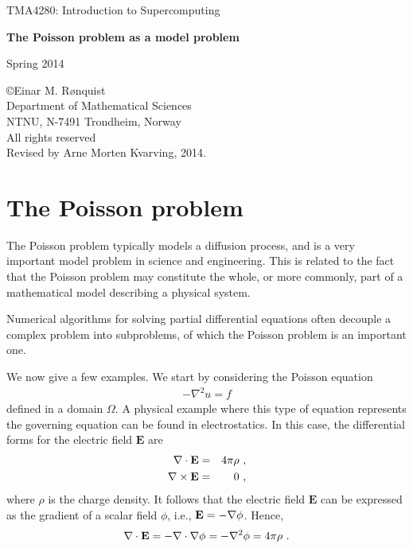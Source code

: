 \documentclass[11pt]{article}
\begin{document}
 
\LARGE
\begin{center}
TMA4280: Introduction to Supercomputing
\end{center}
\vspace{1in}

\begin{center}
{\bf The Poisson problem as a model problem}
\end{center}

\Large
\vspace{0.5in}
\begin{center}
Spring 2014
\end{center}

\vspace{0.5in}

\begin{center}
\copyright Einar M. R{\o}nquist \\
Department of Mathematical Sciences\\
NTNU, N-7491 Trondheim, Norway\\
All rights reserved \\
Revised by Arne Morten Kvarving, 2014.
\end{center}

\large

\newpage

\section{The Poisson problem}
The Poisson problem typically models a diffusion process, and 
is a very important model problem in science and engineering. 
This is related to the fact that the Poisson problem may 
constitute the whole, or more commonly, part of a mathematical 
model describing a physical system.

Numerical algorithms for solving partial differential 
equations often decouple a complex problem into subproblems, 
of which the Poisson problem is an important one. 

We now give a few examples. We start by considering the 
Poisson equation
\begin{eqnarray}
\label{poisson-eq}
- \nabla^2 u = f 
\end{eqnarray}
defined in a domain $\Omega$.
A physical example where this type of equation represents the governing
equation can be found in electrostatics. In this case, the differential forms
for the electric field $\mathbf{E}$ are
\begin{eqnarray}
\nabla \cdot  {\bf E} &=& 4 \pi \rho \,\, ,\\
\nabla \times {\bf E} &=& 0 \,\, ,
\end{eqnarray}
where $\rho$ is the charge density. It follows that the electric field
$\mathbf{E}$ can be expressed as the gradient of a scalar field 
$\phi$, i.e., ${\bf E}= - \nabla \phi$. Hence, 
\begin{eqnarray}
\nabla \cdot  {\bf E} = 
- \nabla \cdot \nabla \phi  = - \nabla^2 \phi = 4 \pi \rho \,\, .
\end{eqnarray}
\end{document}
